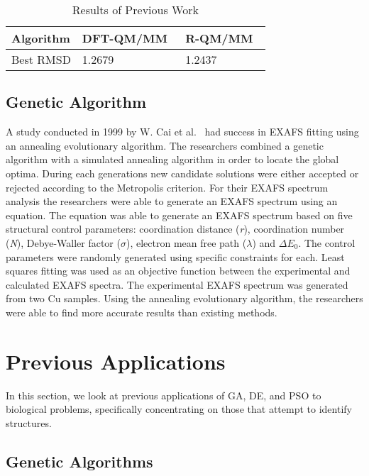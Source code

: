 \begin{table}
	\centering
	\begin{tabular}{ | l | l | l | }
		\hline
		Algorithm & DFT-QM/MM~\cite{luber2011s1} & R-QM/MM~\cite{luber2011s1} \\ \hline
		Best RMSD & 1.2679 & 1.2437 \\ \hline
	\end{tabular}
	\caption{Results of Previous Work}
	\label{fig:previous-work-rmsd}
\end{table}

\subsection{Genetic Algorithm}

A study conducted in 1999 by W. Cai et al.~\cite{cai1999analysis} had success in EXAFS fitting using an annealing evolutionary algorithm. The researchers combined a genetic algorithm with a simulated annealing algorithm in order to locate the global optima. During each generations new candidate solutions were either accepted or rejected according to the Metropolis criterion. For their EXAFS spectrum analysis the researchers were able to generate an EXAFS spectrum using an equation. The equation was able to generate an EXAFS spectrum based on five structural control parameters: coordination distance (\textit{r}), coordination number (\textit{N}), Debye-Waller factor ($\sigma$), electron mean free path ($\lambda$) and $\Delta{E_{0}}$. The control parameters were randomly generated using specific constraints for each. Least squares fitting was used as an objective function between the experimental and calculated EXAFS spectra. The experimental EXAFS spectrum was generated from two Cu samples. Using the annealing evolutionary algorithm, the researchers were able to find more accurate results than existing methods.

\section{Previous Applications}
\label{sec:prev-app}

In this section, we look at previous applications of GA, DE, and PSO to biological problems, specifically concentrating on those that attempt to identify structures.

\subsection{Genetic Algorithms}

